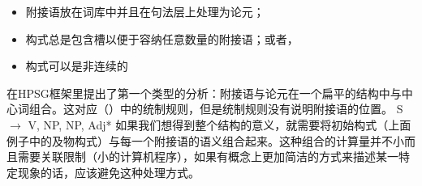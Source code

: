 \begin{itemize}
\item 附接语放在词库中\citep*{NB94,BMS2001a}并且在句法层上处理为论元；
\item 构式总是包含槽以便于容纳任意数量的附接语；或者，
\item 构式可以是非连续的
\end{itemize}
\citet{Kasper94a}在HPSG框架里提出了第一个类型的分析：附接语与论元在一个扁平的结构中与中心词组合。这对应（）中的统制规则，但是统制规则没有说明附接语的位置。
\ea
S $\to$ V, NP, NP, Adj*
\z
如果我们想得到整个结构的意义，就需要将初始构式（上面例子中的及物构式）与每一个附接语的语义组合起来。这种组合的计算量并不小而且需要关联限制（小的计算机程序），如果有概念上更加简洁的方式来描述某一特定现象的话，应该避免这种处理方式。

